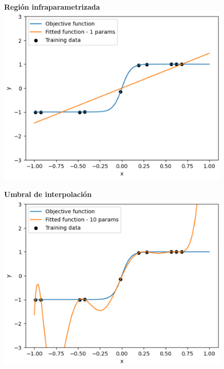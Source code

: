 \begin{figure}[h]
    \centering
    \begin{minipage}{0.32\textwidth}
        \centering
        \textbf{Región infraparametrizada} \\[0.5ex] 
        \includegraphics[width=\linewidth]{img/experiments/hiperbolica_noiseless1.1.png}
    \end{minipage}
    \begin{minipage}{0.32\textwidth}
        \centering
        \textbf{Umbral de interpolación} \\[0.5ex] 
        \includegraphics[width=\linewidth]{img/experiments/hiperbolica_noiseless1.2.png}

\end{minipage}
\end{figure}
